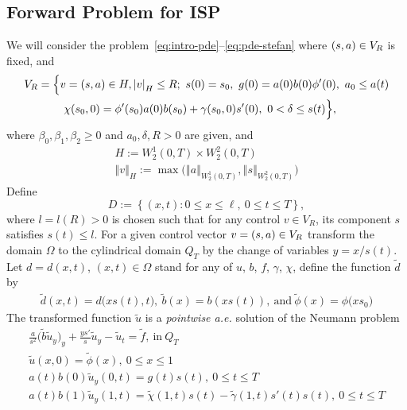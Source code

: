 \documentclass[letterpaper, 10pt]{amsart}
\theoremstyle{definition}
\theoremstyle{remark}
\newcommand{\bk}[1]{\left\{#1\right\}}
\newcommand{\norm}[1]{\left\Vert #1\right\Vert}%
\newcommand{\lnorm}[1]{\left\vert #1\right\vert}%
\begin{document}
\subsection{Forward Problem for ISP}\label{sec:forward-problem}
We will consider the problem~\eqref{eq:intro-pde}--\eqref{eq:pde-stefan} where $(s, a{}) \in V_R$ is fixed, and
\begin{align}
  V_R & =\Big\{
        v=(\controlvars{}) \in H, \lnorm{v}_H \leq R;
        ~s(0) = s_0,
        ~g(0) = a(0)b(0) \phi'(0),
        ~a_0 \leq a(t)\nonumber
  \\
      & \qquad
        ~\chi(s_{0},0) = \phi'(s_{0})a(0)b(s_0) + \gamma(s_0, 0)s'(0),
        ~0 < \delta \leq s(t)
        \Big\},\label{eq:control-set}
\end{align}
where $\beta_0, \beta_1, \beta_2 \geq 0$ and $a_0, \delta, R > 0$ are given, and
\def\acontrolspace{W_2^1}
\def\scontrolspace{W_2^2}
\begin{gather*}
  H := \acontrolspace(0,T)
  \times \scontrolspace(0,T)
    \\
    \norm{v}_H := \max\Big(
    \norm{a}_{\acontrolspace(0,T)},
    \norm{s}_{\scontrolspace(0,T)}
    \Big)
  \end{gather*}
  Define
  \let\l\ell%
\[
  D := \bk{(x,t) : 0\leq x\leq \l,~ 0\leq t\leq T},
\]
where $l = l(R) > 0$ is chosen such that for any control $v\in V_R$, its component
$s$ satisfies $s(t)\leq l$.
For a given control vector $v = (s, a{}) \in V_R$ transform the domain $\Omega$ to the cylindrical domain $Q_T$
by the change of variables $y = x / s(t)$.
Let $d = d(x, t)$, $(x, t) \in \Omega$ stand for any of $u$, $b$, $f$, $\gamma$, $\chi$, define the function $\tilde{d}$ by
\begin{gather*}
  \tilde{d}(x,t) = d\big(x s(t), t\big),~
  \tilde{b}(x) = b(x s(t)),~\text{and}~
  \tilde{\phi}(x) = \phi\big( x s_0\big)
\end{gather*}
\def\utilde{\tilde{u}}
The transformed function $\utilde$ is a \emph{pointwise a.e.} solution of the Neumann problem
\begin{gather}
  \frac{a}{s^2}\big(\tilde{b} \utilde_y\big)_y + \frac{y s'}{s} \utilde_y - \utilde_{t} = \tilde{f}, ~\text{in}~Q_T\label{eq:tform-pde}
  \\
  \utilde(x,0) = \tilde{\phi}(x), ~0 \leq x \leq 1 \label{eq:tform-iv}
  \\
  a(t) b(0) \utilde_y(0, t) = g(t)s(t), ~0 \leq t \leq T   \label{eq:tform-lbdy}
  \\
  a(t) b(1) \utilde_y(1, t) = \tilde{\chi}(1, t) s(t) - \tilde{\gamma}(1,t)s'(t)s(t), ~0 \leq t \leq T \label{eq:tform-rbdy}
\end{gather}
\end{document}

